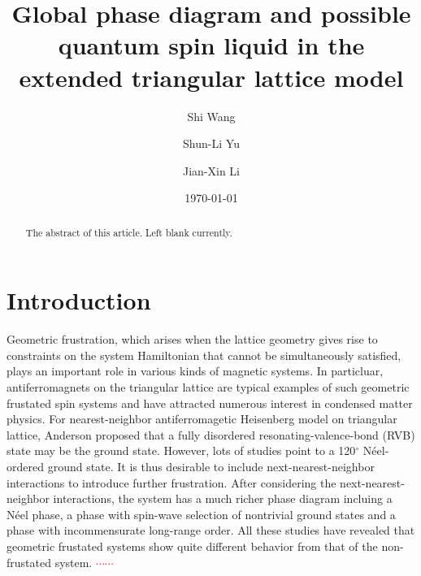 \documentclass[aps,prb,reprint,groupedaddress,showpacs,amsfonts,amsmath,amssymb,superscriptaddress]{revtex4-1}
\begin{document}
\title{Global phase diagram and possible quantum spin liquid in the extended triangular lattice model}

\author{Shi Wang}
\author{Shun-Li Yu}
\author{Jian-Xin Li}

\date{\today}

\begin{abstract}
The abstract of this article. Left blank currently.
\end{abstract}

\maketitle

\section{Introduction}
Geometric frustration, which arises when the lattice geometry gives rise to constraints on the system Hamiltonian that cannot be simultaneously satisfied, plays an important role in various kinds of magnetic systems. In particluar, antiferromagnets on the triangular lattice are typical examples of such geometric frustated spin systems and have attracted numerous interest in condensed matter physics. For nearest-neighbor antiferromagetic Heisenberg model on triangular lattice, Anderson proposed that a fully disordered resonating-valence-bond (RVB) state may be the ground state. However, lots of studies point to a 120$^\circ$ N\'{e}el-ordered ground state. It is thus desirable to include next-nearest-neighbor interactions to introduce further frustration. After considering the next-nearest-neighbor interactions, the system has a much richer phase diagram incluing a N\'{e}el phase, a phase with spin-wave selection of nontrivial ground states and a phase with incommensurate long-range order. All these studies have revealed that geometric frustated systems show quite different behavior from that of the non-frustated system. \textcolor{red}{$\cdots\cdots$}
\end{document}
